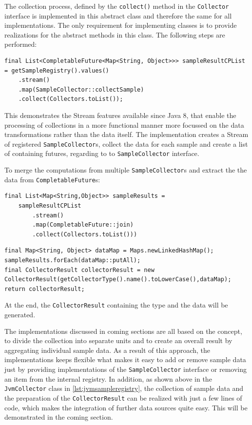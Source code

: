The collection process, defined by the \verb|collect()| method in the \verb|Collector| interface is implemented in this abstract class and
therefore the same for all implementations. The only requirement for implementing classes is to provide realizations for the abstract methods in this class.
The following steps are performed:
\begin{lstlisting}[caption={"AbstractCollector" Fetch sample futures}, captionpos=b, label={lst:abstract-collector-step-one}]
final List<CompletableFuture<Map<String, Object>>> sampleResultCPList = getSampleRegistry().values()
    .stream()
    .map(SampleCollector::collectSample)
    .collect(Collectors.toList());
\end{lstlisting}

This demonstrates the Stream features available since Java 8, that enable the processing of collections in a
more functional manner more focussed on the data transformations rather than the data itself. The
implementation creates a Stream of registered \verb|SampleCollector|s, collect the data for each sample and create a list of containing
futures, regarding to to \verb|SampleCollector| interface.

To merge the computations from multiple \verb|SampleCollector|s and extract the the data from \verb|CompletableFuture|s:

\begin{lstlisting}[caption={"AbstractCollector" Merge and extract data }, captionpos=b, label={lst:abstract-collector-step-two}]
final List<Map<String,Object>> sampleResults =
    sampleResultCPList
        .stream()
        .map(CompletableFuture::join)
        .collect(Collectors.toList()))
\end{lstlisting}

\begin{lstlisting}[caption={"AbstractCollector" Create CollectorResult}, captionpos=b, label={lst:abstract-collector-step-three}]
final Map<String, Object> dataMap = Maps.newLinkedHashMap();
sampleResults.forEach(dataMap::putAll);
final CollectorResult collectorResult = new CollectorResult(getCollectorType().name().toLowerCase(),dataMap);
return collectorResult;
\end{lstlisting}

At the end, the \verb|CollectorResult| containing the type and the data will be generated.

The implementations discussed in coming sections are all based on the concept, to divide the collection into separate units and
to create an overall result by aggregating individual sample data. As a result of this approach, the implementations keeps flexible
what makes it easy to add or remove sample data just by providing implementations of the \verb|SampleCollector| interface or removing
an item from the internal registry. In addition, as shown above in the \verb|JvmCollector| class in \autoref{lst:jvmsampleregistry},
the collection of sample data and the
preparation of the \verb|CollectorResult| can be realized with just a few lines of code, which makes the integration of
further data sources quite easy. This will be demonstrated in the coming section.


